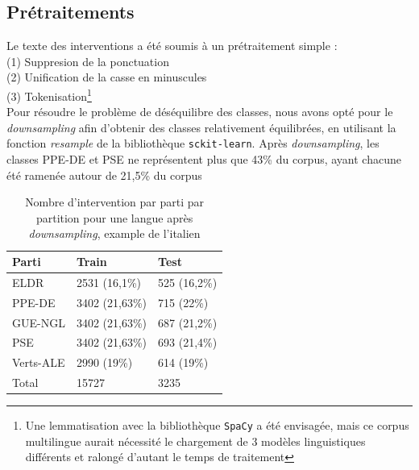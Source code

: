 \subsection{Prétraitements}
Le texte des interventions a été soumis à un prétraitement simple :\\
\indent(1) Suppresion de la ponctuation\\
\indent(2) Unification de la casse en minuscules\\
\indent(3) Tokenisation\footnote {Une lemmatisation avec la bibliothèque \texttt{SpaCy} a été envisagée,
mais ce corpus multilingue aurait nécessité le chargement de 3 modèles linguistiques
différents et ralongé d'autant le temps de traitement}
\\
Pour résoudre le problème de déséquilibre des classes, nous avons opté pour le 
\textit{downsampling} afin d'obtenir des classes relativement équilibrées,
en utilisant la fonction \textit{resample} de la bibliothèque \texttt{sckit-learn}. Après \textit{downsampling},
les classes PPE-DE et PSE ne représentent plus que 43\% du corpus, ayant chacune été ramenée autour de 21,5\% du corpus

\begin{table}[ht]
    \centering
\begin{tabular}{|l|l|l|}
\hline
Parti & Train & Test\\ \hline
ELDR & 2531 (16,1\%) & 525 (16,2\%) \\ \hline
PPE-DE & 3402 (21,63\%) & 715 (22\%) \\ \hline
GUE-NGL & 3402 (21,63\%) & 687 (21,2\%) \\ \hline
PSE & 3402 (21,63\%) & 693 (21,4\%) \\ \hline
Verts-ALE & 2990 (19\%) & 614 (19\%)\\ \hline
Total & 15727 & 3235\\ \hline
\end{tabular}
\caption{Nombre d'intervention par parti par partition pour une langue après \textit{downsampling}, example de l'italien}
\label{tab:stats_downsampled}
\end{table}



